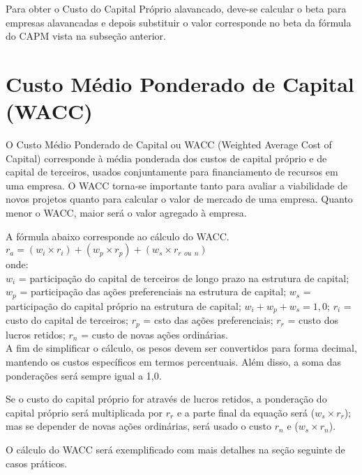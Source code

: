 \documentclass[a4paper,12pt]{article}
\begin{document}
Para obter o Custo do Capital Próprio alavancado, deve-se calcular o beta para empresas alavancadas e depois substituir o valor corresponde no beta da fórmula do CAPM vista na subseção anterior. 


\section{Custo Médio Ponderado de Capital (WACC)}

O Custo Médio Ponderado de Capital ou WACC (Weighted Average Cost of Capital) corresponde à média ponderada dos custos de capital próprio e de capital de terceiros, usados conjuntamente para financiamento de recursos em uma empresa. O WACC torna-se importante tanto para avaliar a viabilidade de novos projetos quanto para calcular o valor de mercado de uma empresa. Quanto menor o WACC, maior será o valor agregado à empresa. 

A fórmula abaixo corresponde ao cálculo do WACC.\\

$r_{a} = (w_{i} \times r_{i}) + (w_{p} \times r_{p}) + (w_{s} \times r_{r \ \ ou \ \ n})$\\ 

onde:\\

$w_{i}$ = participação do capital de terceiros de longo prazo na estrutura de capital; $w_{p}$ = participação das ações preferenciais na estrutura de capital; $w_{s}$ = participação do capital próprio na estrutura de capital; $w_{i} + w_{p} + w_{s} = 1,0$; $r_{i}$ = custo do capital de terceiros; $r_{p}$ = csto das ações preferenciais; $r_{r}$ = custo dos lucros retidos; $r_{n}$ = custo de novas ações ordinárias.\\

A fim de simplificar o cálculo, os pesos devem ser convertidos para forma decimal, mantendo os custos específicos em termos percentuais. Além disso, a soma das ponderações será sempre igual a 1,0. 

Se o custo do capital próprio for através de lucros retidos, a ponderação do capital próprio será multiplicada por $r_{r}$ e a parte final da equação será ($w_{s} \times r_{r}$); mas se depender de novas ações ordinárias, será usado o custo $r_{n}$ e ($w_{s} \times r_{n}$).

O cálculo do WACC será exemplificado com mais detalhes na seção seguinte de casos práticos.
\end{document}
